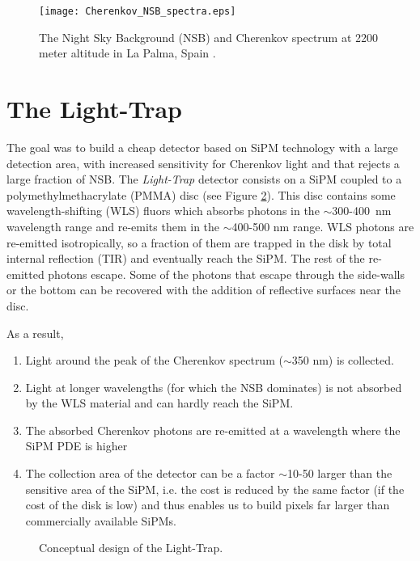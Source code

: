 \documentclass{PoS}
\begin{document}
\begin{figure}
\centering
\texttt{[image: Cherenkov\_NSB\_spectra.eps]}
\caption{The Night Sky Background (NSB) \cite{a} and Cherenkov spectrum at 2200 meter altitude in La Palma, Spain \cite{b}.}\label{fig:NSB}
\end{figure}

\section{The Light-Trap}

The goal was to build a cheap detector based on SiPM technology with a large detection area, with increased sensitivity for Cherenkov light and that rejects a large fraction of NSB. The \textit{Light-Trap} detector consists on a SiPM coupled to a polymethylmethacrylate (PMMA) disc (see Figure \ref{fig:LTconcept}). This disc contains some wavelength-shifting (WLS) fluors which absorbs photons in the \mbox{$\sim$300-400 nm} wavelength range and re-emits them in the $\sim$400-500 nm range. WLS photons are re-emitted isotropically, so a fraction of them  are trapped in the disk by total internal reflection (TIR) and eventually reach the SiPM. The rest of the re-emitted photons escape. Some of the photons that escape through the side-walls or the bottom can be recovered with the addition of reflective surfaces near the disc.

As a result,

\begin{enumerate}
  \item Light around the peak of the Cherenkov spectrum ($\sim$350 nm) is collected.
  \item Light at longer wavelengths (for which the NSB dominates) is not absorbed by the WLS material and can hardly reach the SiPM.
  \item The absorbed Cherenkov photons are re-emitted at a wavelength where the SiPM PDE is higher
  \item The collection area of the detector can be a factor $\sim$10-50 larger than the sensitive area of the SiPM, i.e. the cost is reduced by the same factor (if the cost of the disk is low) and thus enables us to build pixels far larger than commercially available SiPMs.
\end{enumerate}

\begin{figure}[t]
  \centering
  \hspace{-0.0em}
  \caption{Conceptual design of the Light-Trap.}
  \label{fig:LTconcept}
\end{figure}
\end{document}
